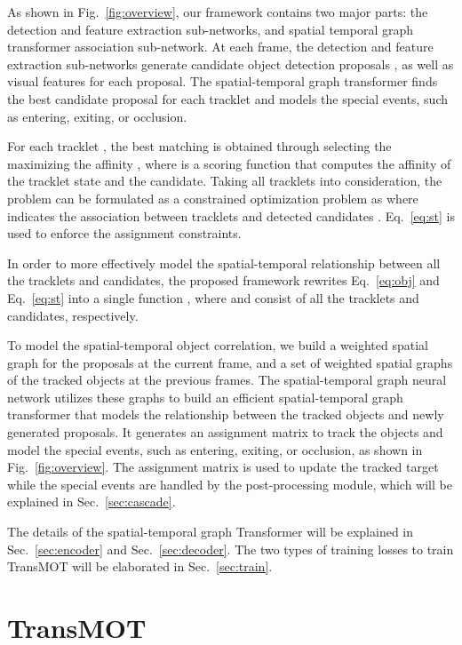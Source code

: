 \documentclass[10pt,twocolumn,letterpaper]{article}
\begin{document}
As shown in  Fig.~\ref{fig:overview}, our framework contains two major parts: the detection and feature extraction sub-networks, and spatial temporal graph transformer association sub-network. At each frame, the detection and feature extraction sub-networks generate  candidate object detection proposals , as well as visual features for each proposal. The spatial-temporal graph transformer finds the best candidate proposal for each tracklet and models the special events, such as entering, exiting, or occlusion.


For each tracklet , the best matching is obtained through selecting the  maximizing the affinity , where  is a scoring function that computes the affinity of the tracklet state and the candidate. Taking all tracklets into consideration, the problem can be formulated as a constrained optimization problem as 
\vspace{-2mm}
\vspace{-3mm}
where  indicates the association between tracklets  and detected candidates . Eq.~\ref{eq:st} is used to enforce the assignment constraints.

In order to more effectively model the spatial-temporal relationship between all the tracklets and candidates, the proposed framework rewrites  Eq.~\ref{eq:obj} and Eq.~\ref{eq:st} into a single function , where  and   consist of all the tracklets and candidates, respectively. 

To model the spatial-temporal object correlation, we build a weighted spatial graph  for the proposals at the current frame, and a set of weighted spatial graphs  of the tracked objects at the previous  frames. 
 The spatial-temporal graph neural network utilizes these graphs to build an efficient spatial-temporal graph transformer that models the relationship between the tracked objects and newly generated proposals. 
 It generates an assignment matrix  to track the objects and model the special events, such as entering, exiting, or occlusion, as shown in Fig.~\ref{fig:overview}. 
 The assignment matrix is used to update the tracked target while the special events are handled by the post-processing module, which will be explained in Sec.~\ref{sec:cascade}.

The details of the spatial-temporal graph Transformer will be explained in Sec.~\ref{sec:encoder} and Sec.~\ref{sec:decoder}. The two types of training losses to train TransMOT will be elaborated in Sec.~\ref{sec:train}.


\section{TransMOT}
\end{document}
